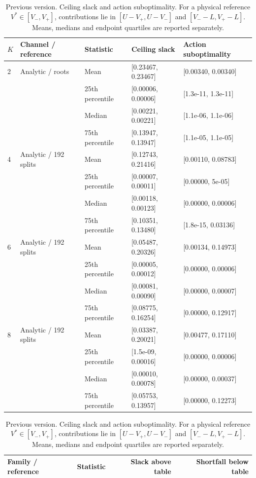 \documentclass[10pt,letterpaper]{article}
\begin{document}
\begin{table}[p]\color{red}\centering\small
\setlength{\tabcolsep}{4pt}
\caption*{Previous version. Ceiling slack and action suboptimality. For a physical reference $V^*\in[V_-,V_+]$, contributions lie in $[U-V_+,U-V_-]$ and $[V_--L,V_+-L]$. Means, medians and endpoint quartiles are reported separately.}
\begin{tabular}{lllll}\toprule
$K$ & Channel / reference & Statistic & Ceiling slack & Action suboptimality\\
\midrule
2 & Analytic / roots & Mean & [0.23467, 0.23467] & [0.00340, 0.00340]\\
 &  & 25th percentile & [0.00006, 0.00006] & [1.3e-11, 1.3e-11]\\
 &  & Median & [0.00221, 0.00221] & [1.1e-06, 1.1e-06]\\
 &  & 75th percentile & [0.13947, 0.13947] & [1.1e-05, 1.1e-05]\\
4 & Analytic / 192 splits & Mean & [0.12743, 0.21416] & [0.00110, 0.08783]\\
 &  & 25th percentile & [0.00007, 0.00011] & [0.00000, 5e-05]\\
 &  & Median & [0.00118, 0.00123] & [0.00000, 0.00006]\\
 &  & 75th percentile & [0.10351, 0.13480] & [1.8e-15, 0.03136]\\
6 & Analytic / 192 splits & Mean & [0.05487, 0.20326] & [0.00134, 0.14973]\\
 &  & 25th percentile & [0.00005, 0.00012] & [0.00000, 0.00006]\\
 &  & Median & [0.00081, 0.00090] & [0.00000, 0.00007]\\
 &  & 75th percentile & [0.08775, 0.16254] & [0.00000, 0.12917]\\
8 & Analytic / 192 splits & Mean & [0.03387, 0.20021] & [0.00477, 0.17110]\\
 &  & 25th percentile & [1.5e-09, 0.00016] & [0.00000, 0.00006]\\
 &  & Median & [0.00010, 0.00078] & [0.00000, 0.00037]\\
 &  & 75th percentile & [0.05753, 0.13957] & [0.00000, 0.12273]\\
\bottomrule\end{tabular}
\par\medskip\begin{minipage}{\linewidth}\small
\par\smallskip\noindent\begin{tabular}{llrr}\toprule Family / reference & Statistic & Slack above table & Shortfall below table\\\midrule

\end{tabular}
\end{minipage}
\end{table}
\end{document}
